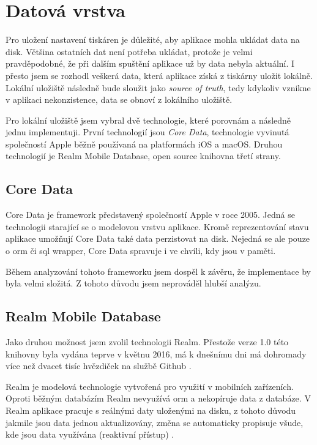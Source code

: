 \section{Datová vrstva}\label{analyza-datova-vrstva}

Pro uložení nastavení tiskáren je důležité, aby aplikace mohla ukládat data na disk.
Většina ostatních dat není potřeba ukládat, protože je velmi pravděpodobné, že při dalším spuštění aplikace už by data nebyla aktuální.
I přesto jsem se rozhodl veškerá data, která aplikace získá z tiskárny uložit lokálně.
Lokální uložiště následně bude sloužit jako \textit{source of truth}, tedy kdykoliv vznikne v aplikaci nekonzistence, data se obnoví z lokálního uložiště.

Pro lokální uložiště jsem vybral dvě technologie, které porovnám a následně jednu implementuji.
První technologií jsou \textit{Core Data}, technologie vyvinutá společností Apple běžně používaná na platformách iOS a macOS.
Druhou technologií je Realm Mobile Database, open source knihovna třetí strany.

\subsection{Core Data}

Core Data je framework představený společností Apple v roce 2005.
Jedná se technologii starající se o modelovou vrstvu aplikace.
Kromě reprezentování stavu aplikace umožňují Core Data také data perzistovat na disk.
Nejedná se ale pouze o \acrshort{orm} či \acrshort{sql} wrapper, Core Data spravuje i ve chvíli, kdy jsou v paměti.

Během analyzování tohoto frameworku jsem dospěl k závěru, že implementace by byla velmi složitá.
Z tohoto důvodu jsem neprováděl hlubší analýzu.

\subsection{Realm Mobile Database}\label{datova-vrstva-realm}

Jako druhou možnost jsem zvolil technologii Realm.
Přestože verze 1.0 této knihovny byla vydána teprve v květnu 2016, má k dnešnímu dni má dohromady více než dvacet tisíc hvězdiček na službě Github \cite{github-realm-repos}.

Realm je modelová technologie vytvořená pro využití v mobilních zařízeních.
Oproti běžným databázím Realm nevyužívá \acrshort{orm} a nekopíruje data z databáze.
V Realm aplikace pracuje s reálnými daty uloženými na disku, z tohoto důvodu jakmile jsou data jednou aktualizovány, změna se automaticky propisuje všude, kde jsou data využívána (reaktivní přístup) \cite{realm-overview}.

